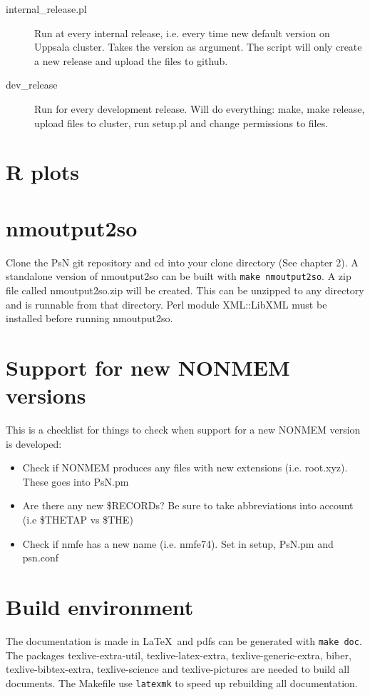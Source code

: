 \begin{description}
\item[internal\_release.pl] Run at every internal release, i.e. every time new default
version on Uppsala cluster. Takes the version as argument. The script will only create
a new release and upload the files to github.
\item[dev\_release] Run for every development release. Will do everything: make, make release,
    upload files to cluster, run setup.pl and change permissions to files.
\end{description}

\section{R plots}


\section{nmoutput2so}
Clone the PsN git repository and cd into your clone directory (See chapter 2). A standalone version of nmoutput2so can be built with \verb|make nmoutput2so|. A zip file called nmoutput2so.zip will be created. This can be unzipped
to any directory and is runnable from that directory.
Perl module XML::LibXML must be installed before running nmoutput2so.

\section{Support for new NONMEM versions}
This is a checklist for things to check when support for a new NONMEM version is developed:
\begin{itemize}
    \item Check if NONMEM produces any files with new extensions (i.e. root.xyz). These goes into PsN.pm
    \item Are there any new \$RECORDs? Be sure to take abbreviations into account (i.e \$THETAP vs \$THE)
    \item Check if nmfe has a new name (i.e. nmfe74). Set in setup, PsN.pm and psn.conf
\end{itemize}


\section{Build environment}
The documentation is made in \LaTeX\ and pdfs can be generated with \verb|make doc|. The
packages texlive-extra-util, texlive-latex-extra, texlive-generic-extra, biber, texlive-bibtex-extra, texlive-science and texlive-pictures are needed to build all documents.
The Makefile use \verb|latexmk| to speed up rebuilding all documentation.

